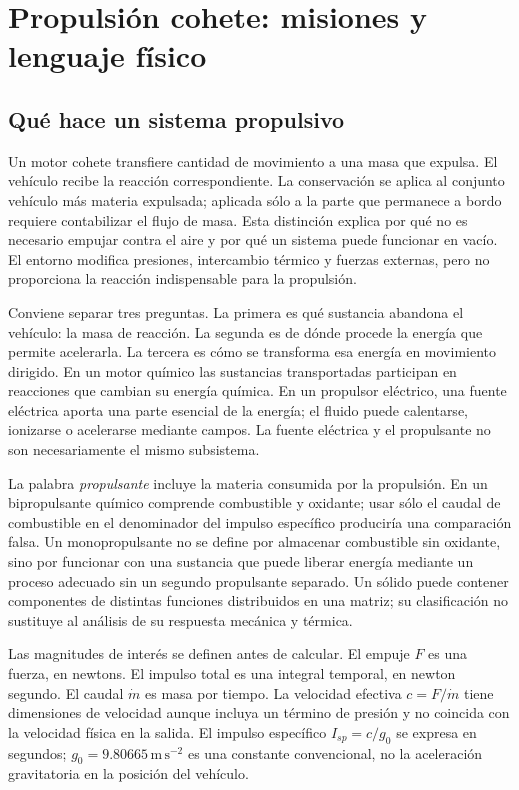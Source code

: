 \chapter{Propulsión cohete: misiones y lenguaje físico}\label{ch:01}
\section{Qué hace un sistema propulsivo}
Un motor cohete transfiere cantidad de movimiento a una masa que expulsa. El vehículo recibe la reacción correspondiente. La conservación se aplica al conjunto vehículo más materia expulsada; aplicada sólo a la parte que permanece a bordo requiere contabilizar el flujo de masa. Esta distinción explica por qué no es necesario empujar contra el aire y por qué un sistema puede funcionar en vacío. El entorno modifica presiones, intercambio térmico y fuerzas externas, pero no proporciona la reacción indispensable para la propulsión.

Conviene separar tres preguntas. La primera es qué sustancia abandona el vehículo: la masa de reacción. La segunda es de dónde procede la energía que permite acelerarla. La tercera es cómo se transforma esa energía en movimiento dirigido. En un motor químico las sustancias transportadas participan en reacciones que cambian su energía química. En un propulsor eléctrico, una fuente eléctrica aporta una parte esencial de la energía; el fluido puede calentarse, ionizarse o acelerarse mediante campos. La fuente eléctrica y el propulsante no son necesariamente el mismo subsistema.

La palabra \emph{propulsante} incluye la materia consumida por la propulsión. En un bipropulsante químico comprende combustible y oxidante; usar sólo el caudal de combustible en el denominador del impulso específico produciría una comparación falsa. Un monopropulsante no se define por almacenar combustible sin oxidante, sino por funcionar con una sustancia que puede liberar energía mediante un proceso adecuado sin un segundo propulsante separado. Un sólido puede contener componentes de distintas funciones distribuidos en una matriz; su clasificación no sustituye al análisis de su respuesta mecánica y térmica.

Las magnitudes de interés se definen antes de calcular. El empuje $F$ es una fuerza, en newtons. El impulso total es una integral temporal, en newton segundo. El caudal $\dot m$ es masa por tiempo. La velocidad efectiva $c=F/\dot m$ tiene dimensiones de velocidad aunque incluya un término de presión y no coincida con la velocidad física en la salida. El impulso específico $I_{sp}=c/g_0$ se expresa en segundos; $g_0=9.80665\,\mathrm{m\,s^{-2}}$ es una constante convencional, no la aceleración gravitatoria en la posición del vehículo.
